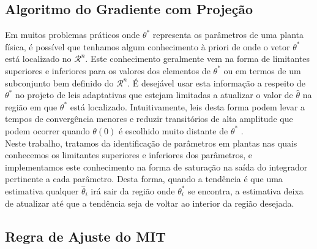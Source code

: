 \documentclass[
	12pt,				%
	openright,			%
	twoside,			%
	a4paper,			%
	english,			%
	french,				%
	spanish,			%
	brazil				%
	]{abntex2}
\begin{document}
 \subsection{Algoritmo do Gradiente com Projeção}
 
 Em muitos problemas práticos onde $\theta^*$ representa os parâmetros de uma planta física, é possível que tenhamos algum conhecimento à priori de onde o vetor $\theta^*$ está localizado no $\mathcal{R}^n$. Este conhecimento geralmente vem na forma de limitantes superiores e inferiores para os valores dos elementos de $\theta^*$ ou em termos de um subconjunto bem definido do $\mathcal{R}^n$. É desejável usar esta informação a respeito de $\theta^*$ no projeto de leis adaptativas que estejam limitadas a atualizar o valor de $\hat{\theta}$ na região em que $\theta^*$ está localizado. Intuitivamente, leis desta forma podem levar a tempos de convergência menores e reduzir transitórios de alta amplitude que podem ocorrer quando $\theta(0)$ é escolhido muito distante de $\theta^*$ \cite[p.~203]{ioannou2}. \\
 
 Neste trabalho, tratamos da identificação de parâmetros em plantas nas quais conhecemos os limitantes superiores e inferiores dos parâmetros, e implementamos este conhecimento na forma de saturação na saída do integrador pertinente a cada parâmetro. Desta forma, quando a tendência é que uma estimativa qualquer $\hat{\theta}_i $ irá sair da região onde $\theta^*_i$ se encontra, a estimativa deixa de atualizar até que a tendência seja de voltar ao interior da região desejada.\\
 
 \subsection{Regra de Ajuste do MIT}
 
\end{document}
